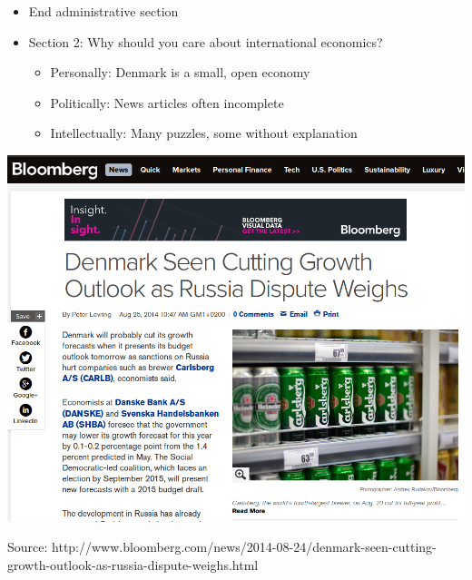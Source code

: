 \documentclass[ignorenonframetext,]{beamer}
\begin{document}
\begin{frame}

\begin{itemize}
\itemsep1pt\parskip0pt
\item
    End administrative section
\end{itemize}

\end{frame}


\begin{frame}

    \begin{itemize}
    \itemsep1pt\parskip0pt
        \item
        Section 2: Why should you care about international economics?
        \begin{itemize}
        \itemsep1pt\parskip0pt
            \item Personally: Denmark is a small, open economy
            \item Politically: News articles often incomplete
            \item Intellectually: Many puzzles, some without explanation
        \end{itemize}
    \end{itemize}

\end{frame}

\begin{frame}

    \includegraphics[scale=0.3]{carlsberg_political.png}

    {\tiny Source: http://www.bloomberg.com/news/2014-08-24/denmark-seen-cutting-growth-outlook-as-russia-dispute-weighs.html }

\end{frame}
\end{document}
